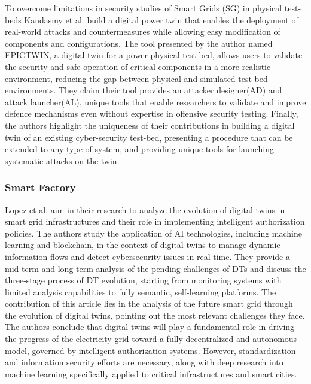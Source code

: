 To overcome limitations in security studies of Smart Grids (SG) in physical test-beds Kandasmy et al.\cite{kandasamyElectricPowerDigital2022} build a digital power twin that enables the deployment of real-world attacks and countermeasures while allowing easy modification of components and configurations. The tool presented by the author named EPICTWIN, a digital twin for a power physical test-bed, allows users to validate the security and safe operation of critical components in a more realistic environment, reducing the gap between physical and simulated test-bed environments. They claim their tool provides an attacker designer(AD) and attack launcher(AL), unique tools that enable researchers to validate and improve defence mechanisms even without expertise in offensive security testing. Finally, the authors highlight the uniqueness of their contributions in building a digital twin of an existing cyber-security test-bed, presenting a procedure that can be extended to any type of system, and providing unique tools for launching systematic attacks on the twin.

\subsubsection{Smart Factory}
Lopez et al.\cite{lopezDIGITALTWINSINTELLIGENT2021} aim in their research to analyze the evolution of digital twins in smart grid infrastructures and their role in implementing intelligent authorization policies. The authors study the application of AI technologies, including machine learning and blockchain, in the context of digital twins to manage dynamic information flows and detect cybersecurity issues in real time. They provide a mid-term and long-term analysis of the pending challenges of DTs and discuss the three-stage process of DT evolution, starting from monitoring systems with limited analysis capabilities to fully semantic, self-learning platforms. The contribution of this article lies in the analysis of the future smart grid through the evolution of digital twins, pointing out the most relevant challenges they face. The authors conclude that digital twins will play a fundamental role in driving the progress of the electricity grid toward a fully decentralized and autonomous model, governed by intelligent authorization systems. However, standardization and information security efforts are necessary, along with deep research into machine learning specifically applied to critical infrastructures and smart cities.


